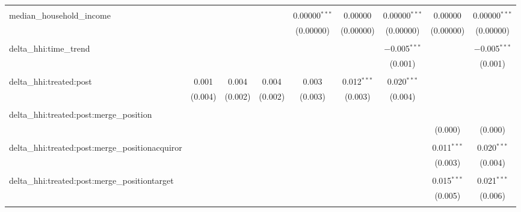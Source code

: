 \begin{table}[H]
{\begin{tabular}{@{\extracolsep{5pt}}lcccccccc}
   & & & & & & & & \\  

  median\_household\_income &  &  &  & 0.00000$^{***}$ & 0.00000 & 0.00000$^{***}$ & 0.00000 & 0.00000$^{***}$ \\  

   &  &  &  & (0.00000) & (0.00000) & (0.00000) & (0.00000) & (0.00000) \\  

   & & & & & & & & \\  

  delta\_hhi:time\_trend &  &  &  &  &  & $-$0.005$^{***}$ &  & $-$0.005$^{***}$ \\  

   &  &  &  &  &  & (0.001) &  & (0.001) \\  

   & & & & & & & & \\  

  delta\_hhi:treated:post & 0.001 & 0.004 & 0.004 & 0.003 & 0.012$^{***}$ & 0.020$^{***}$ &  &  \\  

   & (0.004) & (0.002) & (0.002) & (0.003) & (0.003) & (0.004) &  &  \\  

   & & & & & & & & \\  

  delta\_hhi:treated:post:merge\_position &  &  &  &  &  &  &  &  \\  

   &  &  &  &  &  &  & (0.000) & (0.000) \\  

   & & & & & & & & \\  

  delta\_hhi:treated:post:merge\_positionacquiror &  &  &  &  &  &  & 0.011$^{***}$ & 0.020$^{***}$ \\  

   &  &  &  &  &  &  & (0.003) & (0.004) \\  

   & & & & & & & & \\  

  delta\_hhi:treated:post:merge\_positiontarget &  &  &  &  &  &  & 0.015$^{***}$ & 0.021$^{***}$ \\  

   &  &  &  &  &  &  & (0.005) & (0.006) \\  

   & & & & & & & & \\  


\end{tabular}}
\end{table}
